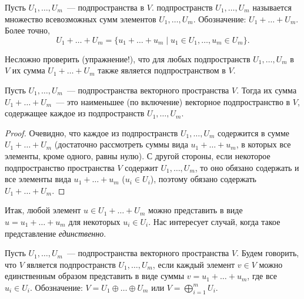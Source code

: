 \begin{definition}
Пусть $U_1,\dots,U_m$~--- подпространства в $V$.
 подпространств $U_1,\dots,U_m$ называется множество
всевозможных сумм элементов $U_1,\dots,U_m$.
Обозначение: $U_1+\dots+U_m$.
Более точно,
$$
U_1+\dots+U_m = \{u_1+\dots+u_m\mid u_1\in U_1,\dots,u_m\in U_m\}.
$$
\end{definition}
Несложно проверить (упражнение!), что для любых подпространств
$U_1,\dots,U_m$ в $V$ их сумма $U_1+\dots+U_m$ также является
подпространством в $V$.
\begin{lemma}
Пусть $U_1,\dots,U_m$~--- подпространства векторного пространства $V$.
Тогда их сумма $U_1+\dots+U_m$~--- это наименьшее (по включение)
векторное подпространство в $V$, содержащее каждое из подпространств
$U_1,\dots,U_m$.
\end{lemma}
\begin{proof}
Очевидно, что каждое из подпространств $U_1,\dots,U_m$ содержится
в сумме $U_1+\dots+U_m$ (достаточно рассмотреть суммы
вида $u_1+\dots+u_m$, в которых все элементы, кроме одного, равны нулю).
С другой стороны, если некоторое подпространство пространства $V$
содержит $U_1,\dots,U_m$, то оно обязано содержать и все элементы
вида $u_1+\dots+u_m$ ($u_i\in U_i$), поэтому обязано содержать
$U_1+\dots+U_m$.
\end{proof}

Итак, любой элемент $u\in U_1+\dots+U_m$ можно представить
в виде $u = u_1+\dots+u_m$ для некоторых $u_i\in U_i$.
Нас интересует случай, когда такое представление
{\em единственно}.

\begin{definition}
Пусть $U_1,\dots,U_m$~--- подпространства векторного пространства $V$.
Будем говорить, что $V$ является  подпространств
$U_1,\dots,U_m$, если каждый элемент $v\in V$ можно единственным образом
представить в виде суммы $v = u_1+\dots+u_m$, где все $u_i\in U_i$.
Обозначение: $V=U_1\oplus\dots\oplus U_m$ или
$V = \bigoplus_{i=1}^m U_i$.
\end{definition}

